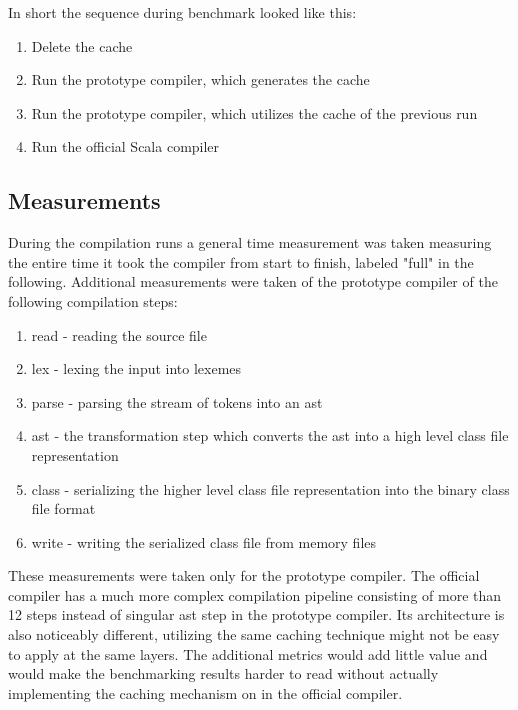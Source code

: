 \documentclass{VUMIFPSbakalaurinis}
\begin{document}

In short the sequence during benchmark looked like this:

\begin{enumerate}
\item{Delete the cache}
\item{Run the prototype compiler, which generates the cache}
\item{Run the prototype compiler, which utilizes the cache of the previous run}
\item{Run the official Scala compiler}
\end{enumerate}

\subsection{Measurements}

During the compilation runs a general time measurement was taken measuring the entire time it took the compiler from start to finish, labeled "full" in the following.
Additional measurements were taken of the prototype compiler of the following compilation steps:

\begin{enumerate}
\item{read - reading the source file}
\item{lex - lexing the input into lexemes}
\item{parse - parsing the stream of tokens into an ast}
\item{ast - the transformation step which converts the ast into a high level class file representation}
\item{class - serializing the higher level class file representation into the binary class file format}
\item{write - writing the serialized class file from memory files}
\end{enumerate}

These measurements were taken only for the prototype compiler.
The official compiler has a much more complex compilation pipeline consisting of more than 12 steps instead of singular ast step in the prototype compiler.
Its architecture is also noticeably different, utilizing the same caching technique might not be easy to apply at the same layers.
The additional metrics would add little value and would make the benchmarking results harder to read without actually implementing the caching mechanism on in the official compiler.
\end{document}
